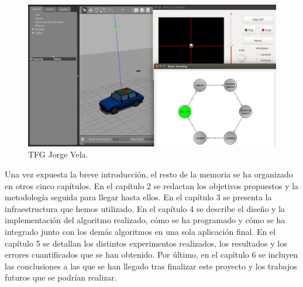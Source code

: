 \begin{figure}[H]
	\begin{center}
		\includegraphics[width=1\textwidth]{imag/IMG50.png}
				\caption{TFG Jorge Vela.}
	\label{f:TFG Jorge Vela}	
	\end{center}
\end{figure}

\hspace{1cm} Una vez expuesta la breve introducción, el resto de la memoria se ha organizado en otros cinco capítulos. En el capítulo 2 se redactan los objetivos propuestos y la metodología seguida para llegar hasta ellos. En el capítulo 3 se presenta la infraestructura que hemos utilizado. En el capítulo 4 se describe el diseño y la implementación del algoritmo realizado, cómo se ha programado y cómo se ha integrado junto con los demás algoritmos en una sola aplicación final. En el capítulo 5 se detallan los distintos experimentos realizados, los resultados y los errores cuantificados que se han obtenido. Por último, en el capítulo 6 se incluyen las conclusiones a las que se han llegado tras finalizar este proyecto y los trabajos futuros que se podrían realizar.
